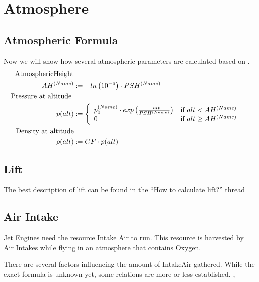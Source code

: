 \documentclass[11pt]{report}
\begin{document}
\chapter{Atmosphere}

\section{Atmospheric Formula}

Now we will show how several atmospheric parameters are calculated
based on \cite{Atmo}.
\begin{align}
  \index{Atmospheric Height} \textrm{AtmosphericHeight}\nonumber\\
  AH^{(Name)} &:= -ln\left(10^{-6}\right)\cdot PSH^{(Name)}\label{AtmosphericHeightEquation}\\
  \index{Pressure} \textrm{Pressure at altitude }&\nonumber\\
  p(alt) &:=
  \left\{
      \begin{array}{l l}
        p_0^{(Name)} \cdot exp\left({\frac{-alt}{PSH^{(Name)}}}\right) & \textrm{if } alt < AH^{(Name)}\\
        0 &\textrm{if } alt \geq AH^{(Name)}
      \end{array}
    \right.\\
    \index{Density} \textrm{Density at altitude}\nonumber\\
    \rho(alt) &:= CF \cdot p(alt)
\end{align}


\section{Lift}

The best description of  lift can be found in the ``How to
calculate lift?'' thread \cite{Lift}

\section{Air Intake}

Jet Engines need the resource Intake Air 
\cite{IntakeAir} to run. This resource is harvested by Air Intakes
\cite{Air Intakes} while flying in an atmosphere that contains Oxygen.

There are several factors influencing the amount of IntakeAir
gathered. While the exact formula is unknown yet, some relations are
more or less established. \cite{AirIntakeModel},
\cite{IntakesDifference}
\end{document}

